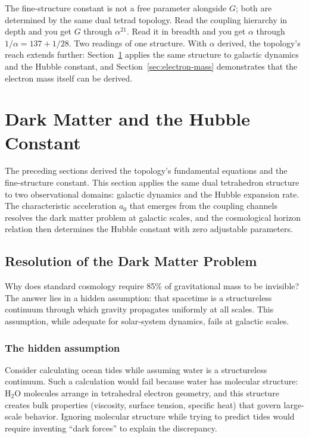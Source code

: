 \documentclass[aps,prd,preprint,superscriptaddress,showpacs,preprintnumbers,amsmath,amssymb,nofootinbib]{revtex4-2}
\begin{document}
The fine-structure constant is not a free parameter alongside $G$; both are determined by the same dual tetrad topology. Read the coupling hierarchy in depth and you get $G$ through $\alpha^{21}$. Read it in breadth and you get $\alpha$ through $1/\alpha = 137 + 1/28$. Two readings of one structure. With $\alpha$ derived, the topology's reach extends further: Section~\ref{sec:darkmatter} applies the same structure to galactic dynamics and the Hubble constant, and Section~\ref{sec:electron-mass} demonstrates that the electron mass itself can be derived.

\section{Dark Matter and the Hubble Constant}
\label{sec:darkmatter}

The preceding sections derived the topology's fundamental equations and the fine-structure constant. This section applies the same dual tetrahedron structure to two observational domains: galactic dynamics and the Hubble expansion rate. The characteristic acceleration $a_0$ that emerges from the coupling channels resolves the dark matter problem at galactic scales, and the cosmological horizon relation then determines the Hubble constant with zero adjustable parameters.

\subsection{Resolution of the Dark Matter Problem}
\label{subsec:darkmatter}

Why does standard cosmology require 85\% of gravitational mass to be invisible? The answer lies in a hidden assumption: that spacetime is a structureless continuum through which gravity propagates uniformly at all scales. This assumption, while adequate for solar-system dynamics, fails at galactic scales.

\subsubsection*{The hidden assumption}

Consider calculating ocean tides while assuming water is a structureless continuum. Such a calculation would fail because water has molecular structure: $\text{H}_2\text{O}$ molecules arrange in tetrahedral electron geometry, and this structure creates bulk properties (viscosity, surface tension, specific heat) that govern large-scale behavior. Ignoring molecular structure while trying to predict tides would require inventing ``dark forces'' to explain the discrepancy.
\end{document}
